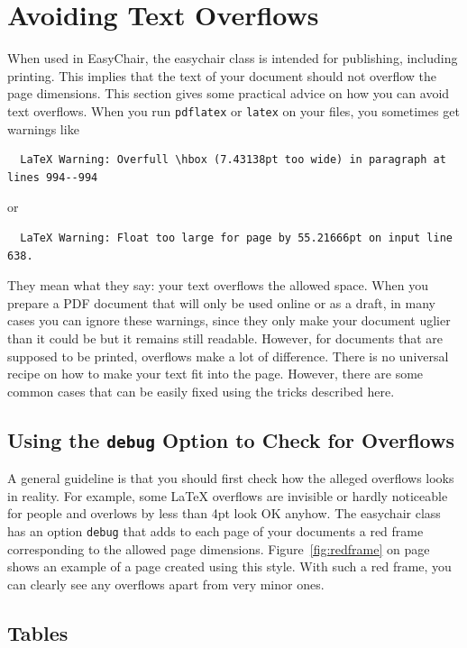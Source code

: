 \documentclass{imav2013}
\newcommand{\easychair}{\textsf{easychair}}
\begin{document}
\section{Avoiding Text Overflows}

When used in EasyChair, the {\easychair} class is intended for
publishing, including printing. This implies that the text of your
document should not overflow the page dimensions. This section gives
some practical advice on how you can avoid text overflows. When you
run \texttt{pdflatex} or \texttt{latex} on your files, you sometimes
get warnings like

\begin{verbatim}
  LaTeX Warning: Overfull \hbox (7.43138pt too wide) in paragraph at lines 994--994
\end{verbatim}
or

\begin{verbatim}
  LaTeX Warning: Float too large for page by 55.21666pt on input line 638.
\end{verbatim}
They mean what they say: your text overflows the allowed space. When
you prepare a PDF document that will only be used online or as a
draft, in many cases you can ignore these warnings, since they only
make your document uglier than it could be but it remains still
readable. However, for documents that are supposed to be printed,
overflows make a lot of difference. There is no universal recipe on
how to make your text fit into the page. However, there are some
common cases that can be easily fixed using the tricks described
here. 

\subsection{Using the \texttt{debug} Option to Check for Overflows}

A general guideline is that you should first check how the alleged
overflows looks in reality. For example, some LaTeX overflows are
invisible or hardly noticeable for people and overlows by
less than 4pt look OK anyhow. The {\easychair} class has an option
\texttt{debug} that adds to each page of your documents a red frame
corresponding to the allowed page
dimensions. Figure~\ref{fig:redframe} on page~\pageref{fig:redframe}
shows an example of a page created using this style. With such a red
frame, you can clearly see any overflows apart from very minor ones.

\subsection{Tables}
\end{document}
